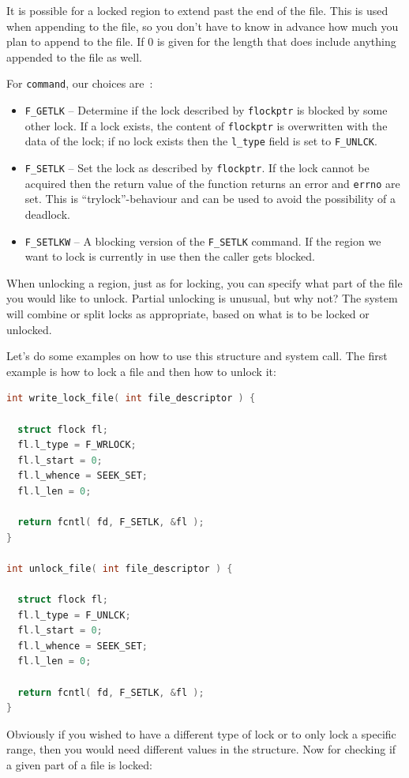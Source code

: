 \documentclass[a4paper]{report}
\begin{document}
It is possible for a locked region to extend past the end of the file. This is used when appending to the file, so you don't have to know in advance how much you plan to append to the file. If 0 is given for the length that does include anything appended to the file as well.


For \texttt{command}, our choices are~\cite{apunix}:
\begin{itemize}
	\item \texttt{F\_GETLK} -- Determine if the lock described by \texttt{flockptr} is blocked by some other lock. If a lock exists, the content of \texttt{flockptr} is overwritten with the data of the lock; if no lock exists then the \texttt{l\_type} field is set to \texttt{F\_UNLCK}.
	\item \texttt{F\_SETLK} -- Set the lock as described by \texttt{flockptr}. If the lock cannot be acquired then the return value of the function returns an error and \texttt{errno} are set. This is ``trylock''-behaviour and can be used to avoid the possibility of a deadlock.
	\item \texttt{F\_SETLKW} -- A blocking version of the \texttt{F\_SETLK} command. If the region we want to lock is currently in use then the caller gets blocked.
\end{itemize}

When unlocking a region, just as for locking, you can specify what part of the file you would like to unlock. Partial unlocking is unusual, but why not? The system will combine or split locks as appropriate, based on what is to be locked or unlocked.

Let's do some examples on how to use this structure and system call. The first example is how to lock a file and then how to unlock it:

\begin{lstlisting}[language=C]
int write_lock_file( int file_descriptor ) {

  struct flock fl;
  fl.l_type = F_WRLOCK;
  fl.l_start = 0;
  fl.l_whence = SEEK_SET;
  fl.l_len = 0;
  
  return fcntl( fd, F_SETLK, &fl );
}

int unlock_file( int file_descriptor ) {

  struct flock fl;
  fl.l_type = F_UNLCK;
  fl.l_start = 0;
  fl.l_whence = SEEK_SET;
  fl.l_len = 0;
  
  return fcntl( fd, F_SETLK, &fl );
}
\end{lstlisting}

Obviously if you wished to have a different type of lock or to only lock a specific range, then you would need different values in the structure. Now for checking if a given part of a file is locked:
\end{document}
